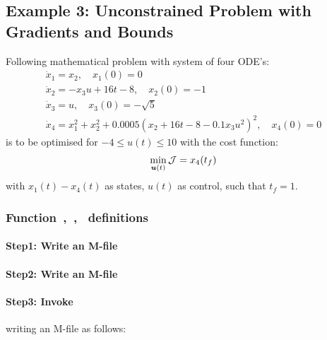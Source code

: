 \subsection{Example 3: Unconstrained Problem  with Gradients and Bounds}
\label{sec:unconprobgradbound}

Following mathematical problem \citep{raj01,luu90_51} with system of
four ODE's:
\begin{gather}
\dot{x}_1 = x_{2}, \quad x_{1}(0) = 0\\
\dot{x}_2 = -x_{3}u + 16t - 8, \quad x_{2}(0) = -1\\
\dot{x}_3 = u, \quad x_{3}(0) = -\sqrt{5}\\
\dot{x}_4 = x_{1}^{2} + x_{2}^{2} + 0.0005(x_{2} + 16t - 8 -
0.1x_{3}u^{2})^{2}, \quad x_{4}(0) = 0
\end{gather} is to be optimised for $-4 \leq u(t) \leq 10$ with the
cost function:  
\begin{equation}
\min_{\ve{u}(t)} \mf{J} = x_{4}(t_{f}) \label{eq:ucpgb}
\end{equation} with $x_1(t) - x_4(t)$ as states, $u(t)$ as control,
such that $t_{f}=1$. 

\subsubsection{Function~,~,~  definitions}
\label{sec:unconprbgradbound-fundef}

\paragraph{Step1: Write an M-file~}

{\small }

\paragraph{Step2: Write an M-file~}

{\small }

\paragraph{Step3: Invoke~} writing an M-file
 as follows: 

{\small }

